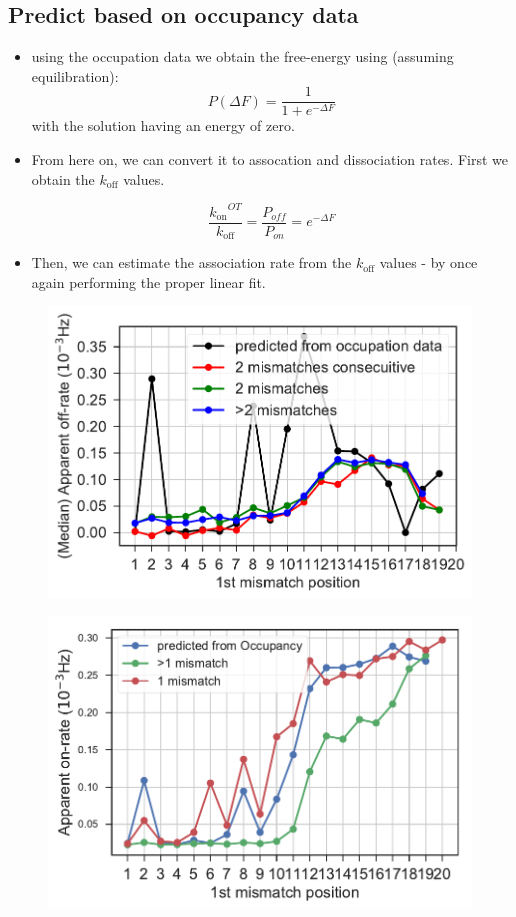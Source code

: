 \documentclass[a4paper,twoside]{revtex4-1}
\newcommand{\rate }[1]{\ensuremath{k_{\text{#1}}} }
\begin{document}
\subsection{Predict based on occupancy data}
\begin{itemize}
\item using the occupation data we obtain the free-energy using (assuming equilibration): 
\begin{equation}
P(\Delta F) = \frac{1}{1 + e^{-\Delta F}}
\end{equation}
with the solution having an energy of zero. 
\item From here on, we can convert it to assocation and dissociation rates. First we obtain the $\rate{off}$ values. 

\begin{equation}
\frac{\rate{on}^{OT}}{\rate{off}} = \frac{P_{off}}{P_{on}} = e^{-\Delta F}
\end{equation}

\item Then, we can estimate the association rate from the $\rate{off}$ values - by once again performing the proper linear fit. 
\end{itemize}


\begin{figure}[H]
\includegraphics[scale=0.5]{fig12_10_10_2018.pdf}
\end{figure}
\begin{figure}[H]
\includegraphics[scale=0.5]{fig13_10_10_2018.pdf}
\end{figure}
\end{document}
